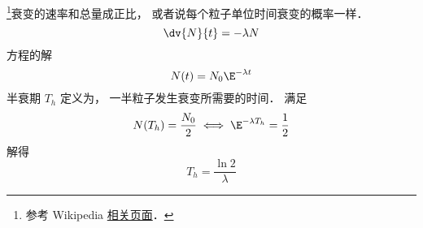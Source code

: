 
\begin{issues}
\issueDraft
\end{issues}



\footnote{参考 Wikipedia \href{https://en.wikipedia.org/wiki/Exponential_decay}{相关页面}．}衰变的速率和总量成正比， 或者说每个粒子单位时间衰变的概率一样．
\begin{equation}
\dv{N}{t} = -\lambda N
\end{equation}
方程的解
\begin{equation}
N(t) = N_0 \E^{-\lambda t}
\end{equation}
半衰期 $T_h$ 定义为， 一半粒子发生衰变所需要的时间． 满足
\begin{equation}
N(T_h) = \frac{N_0}{2} \iff \E^{-\lambda T_h} = \frac{1}{2}
\end{equation}
解得
\begin{equation}
T_h = \frac{\ln 2}{\lambda}
\end{equation}

